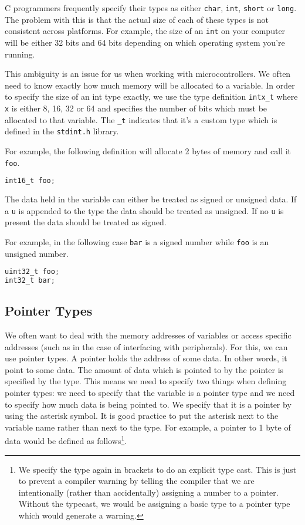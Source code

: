 C programmers frequently specify their types as either \texttt{char}, \texttt{int}, \texttt{short} or \texttt{long}. The problem with this is that the actual size of each of these types is not consistent across platforms. 
For example, the size of an \texttt{int} on your computer will be either 32 bits and 64 bits depending on which operating system you're running.

This ambiguity is an issue for us when working with microcontrollers. We often need to know exactly how much memory will be allocated to a variable. In order to specify the size of an int type exactly, we use the type definition \texttt{intx\_t} where \texttt{x} is either 8, 16, 32 or 64 and specifies the number of bits which must be allocated to that variable. The \texttt{\_t} indicates that it's a custom type which is defined in the \texttt{stdint.h} library. 

For example, the following definition will allocate 2 bytes of memory and call it \texttt{foo}.

\begin{lstlisting}[language=C]
int16_t foo;
\end{lstlisting}

The data held in the variable can either be treated as signed or unsigned data.
If a \texttt{u} is appended to the type the data should be treated as unsigned.
If no \texttt{u} is present the data should be treated as signed.

For example, in the following case \texttt{bar} is a signed number while \texttt{foo} is an unsigned number. 
\begin{lstlisting}[language=C]
uint32_t foo;
int32_t bar;
\end{lstlisting}

\subsection{Pointer Types}
We often want to deal with the memory addresses of variables or access specific addresses (such as in the case of interfacing with peripherals). For this, we can use pointer types. A pointer holds the address of some data. In other words, it point to some data.
The amount of data which is pointed to by the pointer is specified by the type. This means we need to specify two things when defining pointer types: we need to specify that the variable is a pointer type and we need to specify how much data is being pointed to.
We specify that it is a pointer by using the asterisk symbol. It is good practice to put the asterisk next to the variable name rather than next to the type.
For example, a pointer to 1 byte of data would be defined as follows\footnote{We specify the type again in brackets to do an explicit type cast. This is just to prevent a compiler warning by telling the compiler that we are intentionally (rather than accidentally) assigning a number to a pointer. Without the typecast, we would be assigning a basic type to a pointer type which would generate a warning.}.

